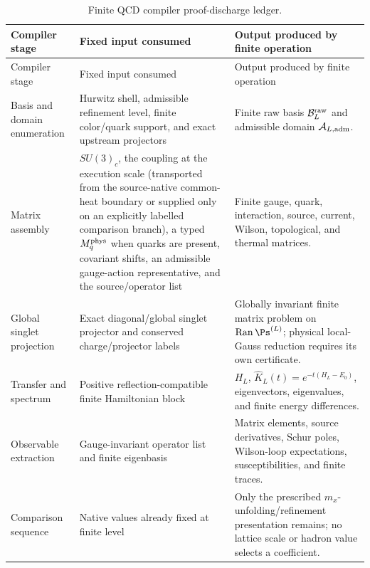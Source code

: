 \documentclass[12pt,a4paper]{article}
\begin{document}
\begin{longtable}{>{\raggedright\arraybackslash}p{} >{\raggedright\arraybackslash}p{} >{\raggedright\arraybackslash}p{}}
\caption[Finite QCD compiler proof-discharge ledger]{Finite QCD compiler proof-discharge ledger.}\label{p10:tab:finite-qcd-compiler-proof-discharge}\\
\toprule
Compiler stage & Fixed input consumed & Output produced by finite operation \\
\midrule
\endfirsthead
\toprule
Compiler stage & Fixed input consumed & Output produced by finite operation \\
\midrule
\endhead
Basis and domain enumeration & Hurwitz shell, admissible refinement level, finite color/quark support, and exact upstream projectors & Finite raw basis \(\mathcal B_L^{\rm raw}\) and admissible domain \(\mathcal A_{L,{\rm adm}}\). \\
Matrix assembly & \(SU(3)_c\), the coupling at the execution scale (transported from the source-native common-heat boundary or supplied only on an explicitly labelled comparison branch), a typed \(M_q^{\rm phys}\) when quarks are present, covariant shifts, an admissible gauge-action representative, and the source/operator list & Finite gauge, quark, interaction, source, current, Wilson, topological, and thermal matrices. \\
Global singlet projection & Exact diagonal/global singlet projector and conserved charge/projector labels & Globally invariant finite matrix problem on \(\operatorname{Ran}\Ps^{(L)}\); physical local-Gauss reduction requires its own certificate. \\
Transfer and spectrum & Positive reflection-compatible finite Hamiltonian block & \(H_L\), \(\widehat K_L(t)=e^{-t(H_L-E_0)}\), eigenvectors, eigenvalues, and finite energy differences. \\
Observable extraction & Gauge-invariant operator list and finite eigenbasis & Matrix elements, source derivatives, Schur poles, Wilson-loop expectations, susceptibilities, and finite traces. \\
Comparison sequence & Native values already fixed at finite level & Only the prescribed \(m_x\)-unfolding/refinement presentation remains; no lattice scale or hadron value selects a coefficient. \\
\bottomrule
\end{longtable}
\end{document}
